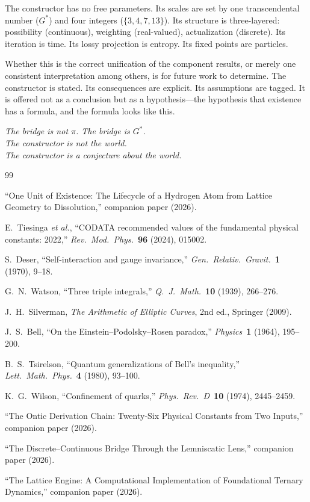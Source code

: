 \documentclass[11pt,a4paper]{article}
\newcommand{\Gstar}{{G^{*}}}
\theoremstyle{compact}
\begin{document}
The constructor has no free parameters. Its scales are set by one transcendental number ($\Gstar$) and four integers ($\{3, 4, 7, 13\}$). Its structure is three-layered: possibility (continuous), weighting (real-valued), actualization (discrete). Its iteration is time. Its lossy projection is entropy. Its fixed points are particles.

Whether this is the correct unification of the component results, or merely one consistent interpretation among others, is for future work to determine. The constructor is stated. Its consequences are explicit. Its assumptions are tagged. It is offered not as a conclusion but as a hypothesis---the hypothesis that existence has a formula, and the formula looks like this.

\medskip

\begin{center}\itshape
The bridge is not $\pi$. The bridge is $\Gstar$.\\[3pt]
The constructor is not the world.\\
The constructor is a conjecture about the world.
\end{center}


\begin{thebibliography}{99}

 ``One Unit of Existence: The Lifecycle of a Hydrogen Atom from Lattice Geometry to Dissolution,'' companion paper (2026).

 E.~Tiesinga \textit{et al.}, ``CODATA recommended values of the fundamental physical constants: 2022,'' \textit{Rev.\ Mod.\ Phys.}\ \textbf{96} (2024), 015002.

 S.~Deser, ``Self-interaction and gauge invariance,'' \textit{Gen.\ Relativ.\ Gravit.}\ \textbf{1} (1970), 9--18.

 G.~N.~Watson, ``Three triple integrals,'' \textit{Q.\ J.\ Math.}\ \textbf{10} (1939), 266--276.

 J.~H.~Silverman, \textit{The Arithmetic of Elliptic Curves}, 2nd ed., Springer (2009).

 J.~S.~Bell, ``On the Einstein--Podolsky--Rosen paradox,'' \textit{Physics}\ \textbf{1} (1964), 195--200.

 B.~S.~Tsirelson, ``Quantum generalizations of Bell's inequality,'' \textit{Lett.\ Math.\ Phys.}\ \textbf{4} (1980), 93--100.

 K.~G.~Wilson, ``Confinement of quarks,'' \textit{Phys.\ Rev.\ D}\ \textbf{10} (1974), 2445--2459.

 ``The Ontic Derivation Chain: Twenty-Six Physical Constants from Two Inputs,'' companion paper (2026).

 ``The Discrete--Continuous Bridge Through the Lemniscatic Lens,'' companion paper (2026).

 ``The Lattice Engine: A Computational Implementation of Foundational Ternary Dynamics,'' companion paper (2026).

\end{thebibliography}
\end{document}
